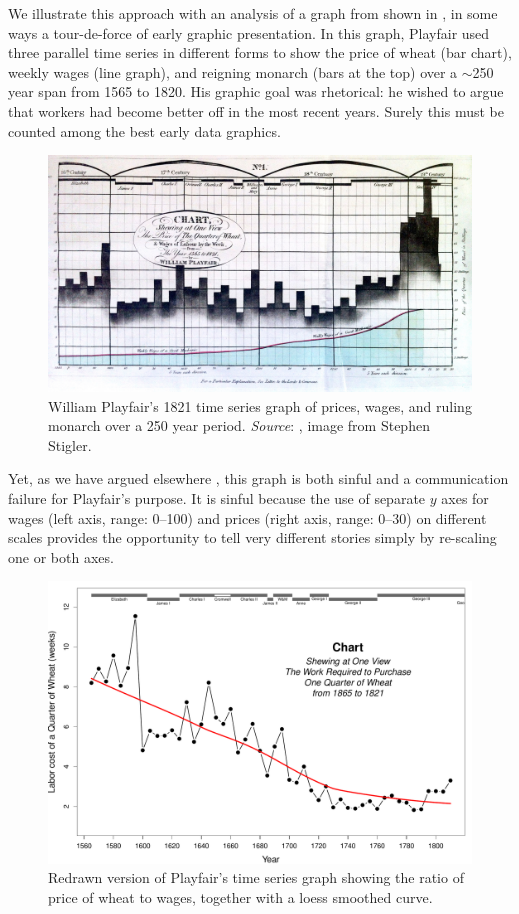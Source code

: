 We illustrate this approach with an analysis of a graph from \citet{Playfair:1821}
shown in , in some ways a tour-de-force of
early graphic presentation. In this graph, Playfair used three parallel time
series in different forms
to show the price of wheat (bar chart), weekly wages (line graph), and reigning monarch (bars at the top)
over a $\sim$250 year span from 1565 to 1820. His graphic goal was rhetorical: he wished to
argue that workers had become better off in the most recent years. Surely this must be counted
among the best early data graphics.

\begin{figure}[htb]
  \centering
  \includegraphics[width=\textwidth]{fig/Playfair1821b}
  \caption{William Playfair's 1821 time series graph of prices, wages, and ruling monarch
  over a 250 year period.
  \emph{Source}: \cite{Playfair:1821}, image from Stephen Stigler.}%
  \label{fig:playfair-wheat1}
\end{figure}

Yet, as we have argued elsewhere \citep{FriendlyDenis:05:scat}, this graph is both sinful
and a communication failure for Playfair's purpose.  It is sinful because the use of separate $y$ axes for
wages (left axis, range: 0--100) and prices (right axis, range: 0--30) on different scales
provides the opportunity to tell very different stories simply by re-scaling one or both
axes.

\begin{figure}[!htb]
  \centering
  \includegraphics[width=.9\textwidth,clip]{fig/wheat2}
  \caption{Redrawn version of Playfair's time series graph
  showing the ratio of price of wheat to wages,
  together with a loess smoothed curve.}
  \label{fig:wheat1}
\end{figure}


